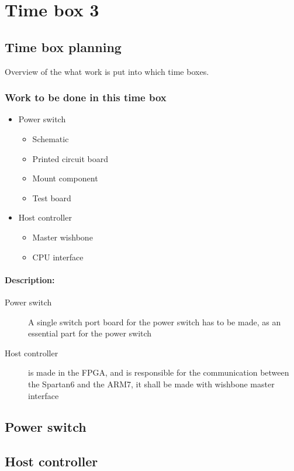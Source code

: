 \section{Time box 3}
\subsection{Time box planning}
Overview of the what work is put into which time boxes.
\begin{figure}[H]
	\begin{centering}
	\end{centering}
\end{figure}

\subsubsection{Work to be done in this time box}
\begin{itemize}
	\item Power switch
	\begin{itemize}
		\item Schematic
		\item Printed circuit board
		\item Mount component
		\item Test board
	\end{itemize}
	\item Host controller
	\begin{itemize}
		\item Master wishbone
		\item CPU interface
	\end{itemize}
\end{itemize}
\paragraph{Description:}
\begin{description}
	\item[Power switch] A single switch port board for the power switch has to be made, as an essential part for the power switch
	\item[Host controller] is made in the FPGA, and is responsible for the communication between the Spartan6 and the ARM7, it shall be made with wishbone master interface 
\end{description}

\subsection{Power switch}

\subsection{Host controller}

